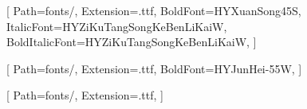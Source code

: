 [%
    Path=fonts/,
    Extension=.ttf,
    BoldFont=HYXuanSong45S,
    ItalicFont=HYZiKuTangSongKeBenLiKaiW,
    BoldItalicFont=HYZiKuTangSongKeBenLiKaiW,
]

[
    Path=fonts/,
    Extension=.ttf,
    BoldFont=HYJunHei-55W,
]

[
    Path=fonts/,
    Extension=.ttf,
]
